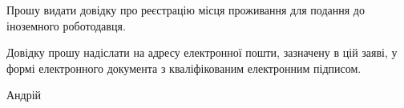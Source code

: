\documentclass[14pt]{dstu4163}
\begin{document}
\makeletterhead

Прошу видати довідку про реєстрацію місця проживання для подання
до іноземного роботодавця.

Довідку прошу надіслати на адресу електронної пошти, зазначену
в цій заяві, у формі електронного документа з кваліфікованим
електронним підписом.


\signature[date = 18.11.2026]{}{Андрій }
\end{document}
